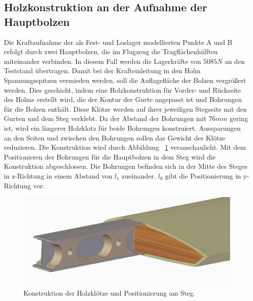 \subsection{Holzkonstruktion an der Aufnahme der Hauptbolzen}
Die Kraftaufnahme der  als Fest- und Loslager modellierten Punkte A und B erfolgt durch zwei Hauptbolzen, die im Flugzeug die Tragflächenhälften miteinander verbinden. In diesem Fall werden die Lagerkräfte von $ 5085N $ an den Teststand übertragen. Damit bei der Krafteinleitung in den Holm Spannungsspitzen vermieden werden, soll die Auflagefläche der Bolzen vergrößert werden. Dies geschieht, indem eine Holzkonstruktion für Vorder- und Rückseite des Holms erstellt wird, die der Kontur der Gurte angepasst ist und Bohrungen für die Bolzen enthält. Diese Klötze werden auf ihrer jeweiligen Stegseite mit den Gurten und dem Steg verklebt. Da der Abstand der Bohrungen mit $ 76mm $ gering ist, wird ein längerer Holzklotz für beide Bohrungen konstruiert. Aussparungen an den Seiten und zwischen den Bohrungen sollen das Gewicht der Klötze reduzieren. Die Konstruktion wird durch Abbildung ~\ref{fig: Klotz} veranschaulicht. Mit dem Positionieren der Bohrungen für die Hauptbolzen in dem Steg wird die Konstruktion abgeschlossen. Die Bohrungen befinden sich in der Mitte des Steges in z-Richtung in einem Abstand von $ l_{1} $ zueinander. $ l_{0} $ gibt die Positionierung in y-Richtung vor. 
\begin{figure}[h]
	\includegraphics[width=1.0\textwidth]{Bilder/Klotz.jpg}
	\caption{Konstruktion der Holzklötze und Positionierung am Steg.}
	\label{fig: Klotz}
\end{figure}
